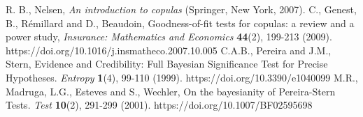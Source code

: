 \documentclass{aip-cp}
\begin{document}
\begin{thebibliography}{20}

%


 R. B., Nelsen, \textit{An introduction to copulas} (Springer, New York, 2007).
%
 C., Genest,  B., R\'{e}millard and D., Beaudoin, Goodness-of-fit tests for copulas: a review and a power study, {\it{Insurance: Mathematics and Economics}} \textbf{44}(2), 199-213 (2009). https://doi.org/10.1016/j.insmatheco.2007.10.005
%
 C.A.B., Pereira and J.M., Stern, Evidence and Credibility: Full Bayesian Significance Test for Precise Hypotheses. {\it{Entropy}} \textbf{1}(4), 99-110 (1999). https://doi.org/10.3390/e1040099
%
 M.R., Madruga, L.G., Esteves and S., Wechler, On the bayesianity of Pereira-Stern Tests. {\it{Test}} \textbf{10}(2), 291-299 (2001). https://doi.org/10.1007/BF02595698











\end{thebibliography}
\end{document}
